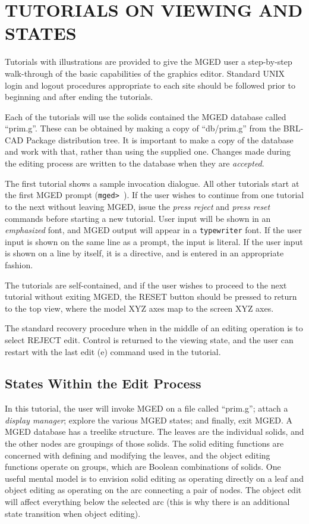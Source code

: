 \chapter{TUTORIALS ON VIEWING AND STATES}

Tutorials with illustrations are provided to give the MGED user a
step-by-step walk-through of the basic capabilities of the graphics
editor.
Standard UNIX login and logout procedures appropriate to each site
should be followed prior to
beginning and after ending the tutorials.

Each of the tutorials will use the solids contained the MGED database called
``prim.g''.
These can be obtained by making a copy of ``db/prim.g''
from the BRL-CAD Package distribution tree.  It is important to make
a copy of the database and work with that, rather than using the
supplied one.  Changes made during the editing process are written
to the database when they are {\sl accepted}.

The first tutorial shows a sample invocation dialogue.  All other
tutorials start at the first MGED prompt ({\tt mged> }). If the user
wishes to continue from one tutorial to the next without leaving MGED,
issue the {\em press reject} and {\em press reset} commands
before starting a new tutorial.
User input will be shown in an
{\em emphasized} font, and MGED output will appear in a {\tt typewriter}
font.  If the user input is shown on the same line as a prompt, the
input is literal.  If the user input is shown on a line by itself,
it is a directive, and is entered in an appropriate fashion.

The tutorials are self-contained, and if the user wishes to proceed to
the next tutorial without exiting MGED,
the RESET button should be pressed
to return to the top view, where the model XYZ axes
map to the screen XYZ axes.

The standard recovery procedure when in the middle of an editing operation
is to select REJECT edit.  Control is
returned to the viewing state, and the user can restart with the last edit (e)
command used in the tutorial.

\section{States Within the Edit Process}

In this tutorial, the user will invoke MGED on a file called ``prim.g'';
attach a {\sl display manager\/}; explore the various MGED states;
and finally, exit MGED.  A MGED database has a treelike structure.  The
leaves are the individual solids, and the other nodes are groupings
of those solids.  The solid editing functions are concerned with defining
and modifying the leaves, and the object editing functions operate
on groups, which are Boolean combinations of solids.  One useful mental
model is to envision solid editing as operating directly on a leaf and
object editing as operating on the arc connecting a pair of nodes.  The
object edit will affect everything below the selected arc (this is why
there is an additional state transition when object editing).

